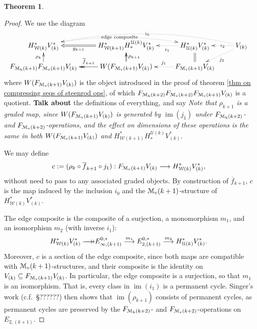 \documentclass[11pt]{amsart}
\theoremstyle{plain}
\newtheorem{thm}{Theorem}[section]
\theoremstyle{definition}
\DeclareMathOperator{\im}{im}
\renewcommand{\to}{\longrightarrow}
\newcommand{\calW}{\mathcal{W}}
\newcommand{\calU}{\mathcal{U}}
\newcommand{\calM}{\mathcal{M}}
\theoremstyle{plain}
\newcommand{\epi}{{\,\makebox[0cm][l]{\ensuremath\to}\to}}
\begin{document}
\begin{Calculations of HWn for n nonzero}
\begin{thm}
\end{thm}
\begin{proof}
We use the diagram
\[\xymatrix@R=4mm{
H_{\calW(k)}^{*}V^{*}_{(k)}\ar@{..>}@/^1.22em/[rr]|-{\textup{\,edge composite\,}}
&H_{\calW(k+1)}^{*}H_*^{\calU(k)}V_{(k)}^*\ar@{=>}[l]^-{g_{k+1}}%
&H^*_{\calU(k)}V^*_{(k)}\ar@{..>}[l]^-{i_1}
&V_{(k)}\ar@{..>}[l]|-{\,i_2\,}\ar@{..>}[ld]^-{j_2}\ar@{..>}@/_1.72em/[lll]|-{\,i_0\,}
\\
F_{\calM_{\textup{h}}(k+1)}F_{\calM_{\textup{v}}(k+1)}V_{(k)}\ar[u]^-{\rho_k}
&W(F_{\calM_\textup{v}(k+1)}V_{(k)})\ar[u]\ar@{->>}[l]_-{\overline{f}_{k+1}}\ar[u]_-{\rho_{k+1}}
&F_{\calM_\textup{v}(k+1)}V_{(k)}\ar@{..>}[l]_-{j_1}\ar@{=}[u]%
}\]
where $W(F_{\calM_\textup{v}(k+1)}V_{(k)})$ is the object introduced in the proof of theorem \ref{thm on compressing seqs of steenrod ops}, of which $F_{\calM_{\textup{h}}(k+2)}F_{\calM_{\textup{v}}(k+2)}F_{\calM_\textup{v}(k+1)}V_{(k)}$ is a quotient. \textbf{Talk about }the definitions of everything, and say \emph{Note that $\rho_{k+1}$ is a graded map, since $W(F_{\calM_\textup{v}(k+1)}V_{(k)})$ is generated by $\im(j_1)$ under $F_{\calM_\textup{h}(k+2)}$- and $F_{\calM_\textup{v}(k+2)}$-operations, and the effect on dimensions of these operations is the same in both $W(F_{\calM_\textup{v}(k+1)}V_{(k)})$ and $H_{\calW(k+1)}^{*}H_*^{\calU(k)}V_{(k)}^*$}.

 We may define 
\[c:=(\rho_k\circ \overline{f}_{k+1}\circ j_1):F_{\calM_\textup{v}(k+1)}V_{(k)}\to H_{\calW(k)}^{*}V^{*}_{(k)},\]
without need to pass to any associated graded objects. By construction of $\overline{f}_{k+1}$,  $c$ is the map induced by the inclusion $i_0$ and the $\calM_\textup{v}(k+1)$-structure of $H^{*}_{\calW(k)}V^{*}_{(k)}$.

The edge composite is the composite of a surjection, a monomorphism $m_1$, and an isomorphism $m_2$ (with inverse $i_1$):
\[H^*_{\calW(k)}V^*_{(k)}\epi E_{\infty,(k+1)}^{0,*}\overset{m_1}{\to}E_{2,(k+1)}^{0,*}\overset{m_2}{\to}H^*_{\calU(k)}V^*_{(k)}.\]
Moreover, $c$ is a section of the edge composite, since both maps are compatible with $\calM_\textup{v}(k+1)$-structures, and their composite is the identity on $V_{(k)}\subseteq  F_{\calM_\textup{v}(k+1)}V_{(k)}$.
In particular, the edge composite is a surjection, so that $m_{1}$ is an isomorphism. That is, every class in $\im(i_1)$ is a permanent cycle. Singer's work (c.f.\ \S??????) then shows that $\im(\rho_{k+1})$ consists of permanent cycles, as permanent cycles are preserved by the $F_{\calM_\textup{h}(k+2)}$- and $F_{\calM_\textup{v}(k+2)}$-operations on $E_{2,(k+1)}$.


\end{proof}
\end{Calculations of HWn for n nonzero}
\end{document}
